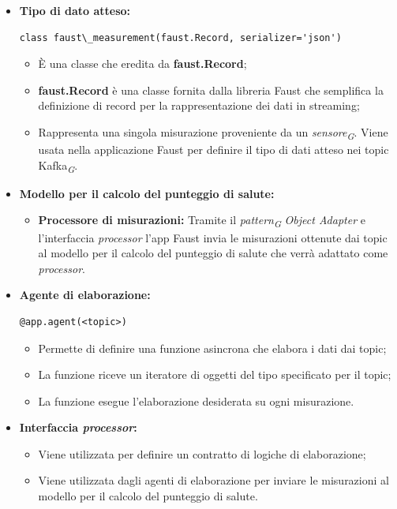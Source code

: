 \begin{itemize}
    \item \textbf{Tipo di dato atteso:}
     \begin{lstlisting}[style=code]
    class faust\_measurement(faust.Record, serializer='json')
    \end{lstlisting}  
    \begin{itemize}
        \item È una classe che eredita da \textbf{faust.Record};
        \item \textbf{faust.Record} è una classe fornita dalla libreria Faust che semplifica la definizione di record per la rappresentazione dei dati in streaming;
        \item Rappresenta una singola misurazione proveniente da un \textit{sensore}\textsubscript{\textit{G}}. Viene usata nella applicazione Faust per definire il tipo di dati atteso nei topic Kafka\textsubscript{\textit{G}}.
    \end{itemize}

    \item \textbf{Modello per il calcolo del punteggio di salute:}
    \begin{itemize}
        \item \textbf{Processore di misurazioni:}
        Tramite il \textit{pattern}\textsubscript{\textit{G}} \textit{Object Adapter} e l'interfaccia \textit{processor} l'app Faust invia le misurazioni ottenute dai topic al modello per il calcolo del punteggio di salute che verrà adattato come \textit{processor}.
    \end{itemize}

    \item \textbf{Agente di elaborazione:} 
    \begin{lstlisting}[style=code]
    @app.agent(<topic>)
    \end{lstlisting}  
    \begin{itemize}
        \item Permette di definire una funzione asincrona che elabora i dati dai topic;
        \item La funzione riceve un iteratore di oggetti del tipo specificato per il topic;
        \item La funzione esegue l'elaborazione desiderata su ogni misurazione.
    \end{itemize}

    \item \textbf{Interfaccia \textit{processor}:}
    \begin{itemize}
        \item Viene utilizzata per definire un contratto di logiche di elaborazione;
        \item Viene utilizzata dagli agenti di elaborazione per inviare le misurazioni al modello per il calcolo del punteggio di salute.
    \end{itemize}


\end{itemize}
